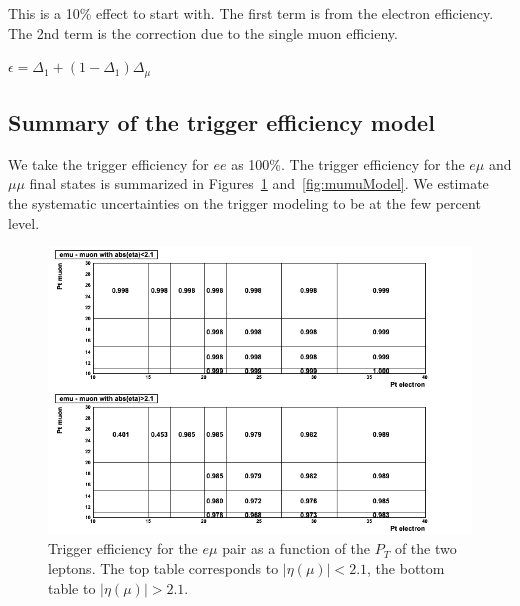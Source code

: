 This is a 10\% effect to start with.  
The first term is from the electron efficiency.  The 2nd term is the correction
due to the single muon efficieny. 

\begin{center}
$\epsilon = \Delta_1 + (1-\Delta_1)\Delta_{\mu}$
\end{center}

\subsection{Summary of the trigger efficiency model}
\label{sec:trgeffsum}

We take the trigger efficiency for $ee$ as 100\%.  The trigger efficiency
for the $e\mu$ and $\mu\mu$ final states is summarized in 
Figures~\ref{fig:emuModel} and~\ref{fig:mumuModel}.
We estimate the systematic uncertainties on the trigger modeling 
to be at the few percent level.

\begin{figure}[htb]
\begin{center}
\includegraphics[width=0.99\linewidth]{emuModel.png}
\caption{\label{fig:emuModel}\protect Trigger efficiency for the
$e\mu$ pair as a function of the $P_T$ of the two leptons.
The top table corresponds to $|\eta(\mu)| < 2.1$, the bottom
table to $|\eta(\mu)| > 2.1$.} 
\end{center}
\end{figure}
\clearpage


